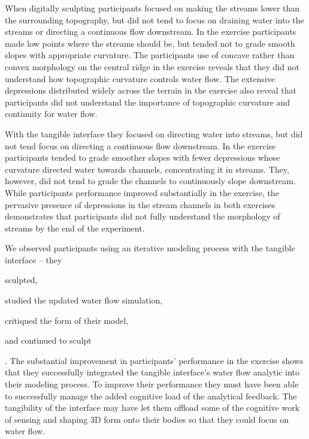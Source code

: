 \documentclass{isprs}
\begin{document}
When digitally sculpting 
participants focused on making the streams lower than the surrounding topography, 
but did not tend to focus on draining water into the streams or 
directing a continuous flow downstream.
%
In the  exercise participants made low points where the streams should be,
but tended not to grade smooth slopes with appropriate curvature. 
%
The participants use of concave rather than convex morphology on the central ridge 
in the  exercise reveals that they did not understand how topographic curvature controls water flow.
%
The extensive depressions distributed widely across the terrain in the  exercise 
also reveal that participants did not understand the importance of topographic curvature and continuity for water flow. 

With the tangible interface they focused on directing water into streams,
but did not tend focus on directing a continuous flow downstream.
%
In the  exercise participants tended to grade 
smoother slopes with fewer depressions whose curvature directed water towards channels, concentrating it in streams. They, however, did not tend to grade the channels to continuously slope downstream. 
%
While participants performance improved substantially in the  exercise, 
the pervasive presence of depressions in the stream channels
in both exercises demonstrates that participants did not fully understand the morphology of streams by the end of the experiment. 

We observed participants using an iterative modeling process with the tangible interface -- 
they 
\begin{enumerate*}[label=\alph*),font=\itshape]
\item sculpted, 
\item studied the updated water flow simulation, 
\item critiqued the form of their model, 
\item and continued to sculpt
\end{enumerate*}.
%
The substantial improvement in participants' performance in the  exercise
shows that they successfully integrated the tangible interface's water flow analytic 
into their modeling process. 
%
To improve their performance they must have been able to successfully manage the added cognitive load of the analytical feedback. 
%
The tangibility of the interface may have let them offload some of the cognitive work of sensing and shaping 3D form onto their bodies
so that they could focus on water flow. 
\end{document}
